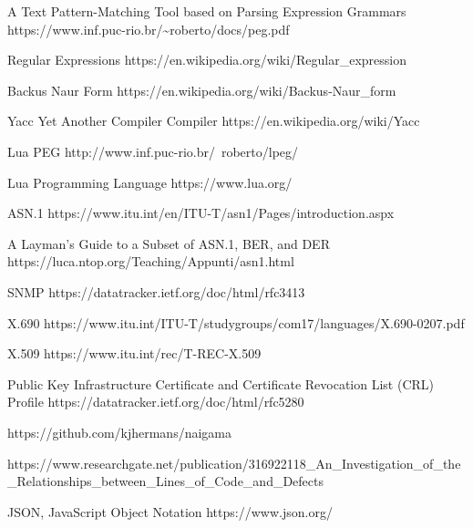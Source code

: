 \begin{thebibliography}{12}

  A Text Pattern-Matching Tool based on Parsing Expression Grammars
  https://www.inf.puc-rio.br/\~{}roberto/docs/peg.pdf

  Regular Expressions
  https://en.wikipedia.org/wiki/Regular\_expression

  Backus Naur Form
  https://en.wikipedia.org/wiki/Backus-Naur\_form

  Yacc Yet Another Compiler Compiler
  https://en.wikipedia.org/wiki/Yacc

  Lua PEG
  http://www.inf.puc-rio.br/~roberto/lpeg/

  Lua Programming Language
  https://www.lua.org/

  ASN.1
  https://www.itu.int/en/ITU-T/asn1/Pages/introduction.aspx

  A Layman's Guide to a Subset of ASN.1, BER, and DER
  https://luca.ntop.org/Teaching/Appunti/asn1.html

  SNMP
  https://datatracker.ietf.org/doc/html/rfc3413

  X.690
  https://www.itu.int/ITU-T/studygroups/com17/languages/X.690-0207.pdf

  X.509
  https://www.itu.int/rec/T-REC-X.509

  Public Key Infrastructure Certificate
             and Certificate Revocation List (CRL) Profile
  https://datatracker.ietf.org/doc/html/rfc5280

  https://github.com/kjhermans/naigama

  https://www.researchgate.net/publication/316922118\_An\_Investigation\_of\_the\_Relationships\_between\_Lines\_of\_Code\_and\_Defects

  JSON, JavaScript Object Notation
  https://www.json.org/

\end{thebibliography}
